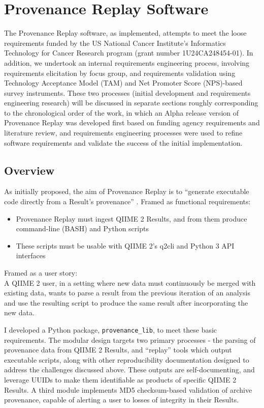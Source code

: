 \chapter{Provenance Replay Software}
The Provenance Replay software, as implemented, attempts to meet the loose
requirements funded by the US National Cancer Institute’s Informatics Technology
for Cancer Research program (grant number 1U24CA248454-01). In addition, we
undertook an internal requirements engineering process, involving requirements
elicitation by focus group, and requirements validation using Technology
Acceptance Model (TAM) \parencite{davis_perceived_1989} and Net Promoter Score
\parencite{reichheld_one_2003} (NPS)-based survey instruments. These two
processes (initial development and requirements engineering research) will be
discussed in separate sections roughly corresponding to the chronological order
of the work, in which an Alpha release version of Provenance Replay was
developed first based on funding agency requirements and literature review, and
requirements engineering processes were used to refine software requirements and
validate the success of the initial implementation.

\section{Overview}

As initially proposed, the aim of Provenance Replay is to “generate executable
code directly from a Result’s provenance” \parencite{caporaso_nci_2022}.
Framed as functional requirements:
\begin{itemize}
    \item Provenance Replay must ingest QIIME 2 Results, and from them produce command-line (BASH) and Python scripts
    \item These scripts must be usable with QIIME 2’s q2cli and Python 3 API interfaces
\end{itemize}

\noindent Framed as a user story: \\
A QIIME 2 user, in a setting where new data must continuously be
merged with existing data, wants to parse a result from the previous iteration
of an analysis and use the resulting script to produce the same result after
incorporating the new data. 

I developed a Python package, \texttt{provenance\_lib}, to meet these basic
requirements.  The modular design targets two primary processes - the parsing of
provenance data from QIIME 2 Results, and “replay” tools which output executable
scripts, along with other reproducibility documentation designed to address the
challenges discussed above. These outputs are self-documenting, and leverage
UUIDs to make them identifiable as products of specific QIIME 2 Results. A third
module implements MD5 checksum-based validation of archive provenance, capable
of alerting a user to losses of integrity in their Results. 


